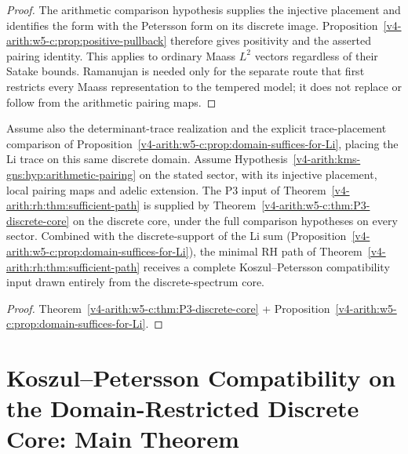 \begin{proof}
The arithmetic comparison hypothesis supplies the injective placement
and identifies the form with the Petersson form on its discrete
image. Proposition~\ref{v4-arith:w5-c:prop:positive-pullback}
therefore gives positivity and the asserted pairing identity.
This applies to ordinary Maass \(L^2\) vectors regardless of their
Satake bounds. Ramanujan is needed only for the separate route that
first restricts every Maass representation to the tempered model;
it does not replace or follow from the arithmetic pairing maps.
\end{proof}

\begin{corollary}
\label{v4-arith:w5-c:cor:P3-input}
Assume also the determinant-trace realization and the explicit
trace-placement comparison of
Proposition~\ref{v4-arith:w5-c:prop:domain-suffices-for-Li},
placing the Li trace on this same discrete domain.
Assume Hypothesis~\ref{v4-arith:kms-gns:hyp:arithmetic-pairing}
on the stated sector, with its injective placement, local pairing maps
and adelic extension.
The P3 input of
Theorem~\ref{v4-arith:rh:thm:sufficient-path} is supplied by
Theorem~\ref{v4-arith:w5-c:thm:P3-discrete-core} on the discrete core,
under the full comparison hypotheses on every sector. Combined with the discrete-support of the Li
sum (Proposition~\ref{v4-arith:w5-c:prop:domain-suffices-for-Li}), the minimal
RH path of Theorem~\ref{v4-arith:rh:thm:sufficient-path} receives a complete
Koszul--Petersson compatibility input drawn entirely from the
discrete-spectrum core.
\end{corollary}

\begin{proof}
Theorem~\ref{v4-arith:w5-c:thm:P3-discrete-core} + Proposition~\ref{v4-arith:w5-c:prop:domain-suffices-for-Li}.
\end{proof}

\section{Koszul--Petersson Compatibility on the Domain-Restricted Discrete Core: Main Theorem}
\label{v4-arith:w5-c:main-theorem}

